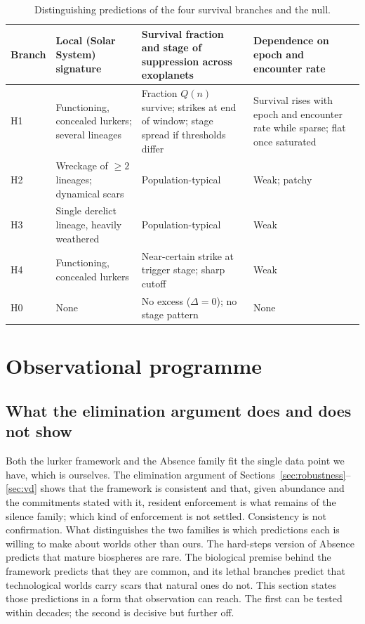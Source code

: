 \documentclass[preprint,12pt]{elsarticle}
\theoremstyle{definition}
\begin{document}
\begin{table}[!htbp]
\centering
\caption{Distinguishing predictions of the four survival branches and the null.}
\label{tab:branches}
\small
\begin{tabularx}{\textwidth}{@{}lXXX@{}}
\toprule
Branch & Local (Solar System) signature & Survival fraction and stage of suppression across exoplanets & Dependence on epoch and encounter rate \\
\midrule
H1 & Functioning, concealed lurkers; several lineages & Fraction $Q(n)$ survive; strikes at end of window; stage spread if thresholds differ & Survival rises with epoch and encounter rate while sparse; flat once saturated \\
H2 & Wreckage of $\geq 2$ lineages; dynamical scars & Population-typical & Weak; patchy \\
H3 & Single derelict lineage, heavily weathered & Population-typical & Weak \\
H4 & Functioning, concealed lurkers & Near-certain strike at trigger stage; sharp cutoff & Weak \\
H0 & None & No excess ($\Delta = 0$); no stage pattern & None \\
\bottomrule
\end{tabularx}
\end{table}

\section{Observational programme}
\label{sec:falsifier}

\subsection{What the elimination argument does and does not show}

Both the lurker framework and the Absence family fit the single data point we have, which is ourselves. The elimination argument of Sections~\ref{sec:robustness}--\ref{sec:vd} shows that the framework is consistent and that, given abundance and the commitments stated with it, resident enforcement is what remains of the silence family; which kind of enforcement is not settled. Consistency is not confirmation. What distinguishes the two families is which predictions each is willing to make about worlds other than ours. The hard-steps version of Absence predicts that mature biospheres are rare. The biological premise behind the framework predicts that they are common, and its lethal branches predict that technological worlds carry scars that natural ones do not. This section states those predictions in a form that observation can reach. The first can be tested within decades; the second is decisive but further off.
\end{document}
